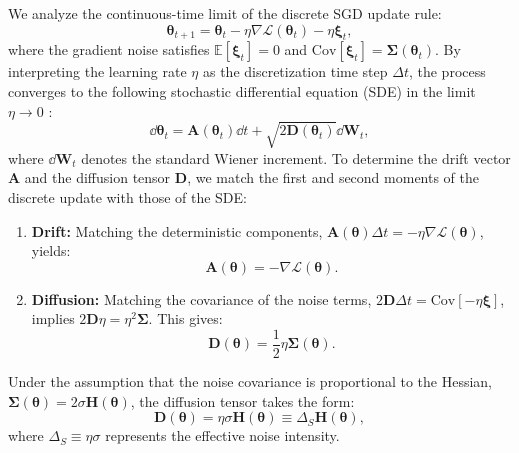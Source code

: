 \documentclass[aps,prx,reprint,superscriptaddress,longbibliography,nofootinbib,floatfix]{revtex4-2}
\begin{document}
We analyze the continuous-time limit of the discrete SGD update rule:
\begin{equation}
    \bm{\theta}_{t+1} = \bm{\theta}_t - \eta \nabla \mathcal{L}(\bm{\theta}_t) - \eta \bm{\xi}_t,
    \label{eq:si_sgd_update} 
\end{equation}
where the gradient noise satisfies $\mathbb{E}[\bm{\xi}_t] = 0$ and $\text{Cov}[\bm{\xi}_t] = \mathbf{\Sigma}(\bm{\theta}_t)$. By interpreting the learning rate $\eta$ as the discretization time step $\Delta t$, the process converges to the following stochastic differential equation (SDE) in the limit $\eta \to 0$ \cite{liHessianBasedAnalysis2020,liStochasticModifiedEquations2017}:
\begin{equation}
    \dd\bm{\theta}_t = \mathbf{A}(\bm{\theta}_t) \dd t + \sqrt{2\mathbf{D}(\bm{\theta}_t)} \dd \mathbf{W}_t,
    \label{eq:si_sde} 
\end{equation}
where $\dd \mathbf{W}_t$ denotes the standard Wiener increment. To determine the drift vector $\mathbf{A}$ and the diffusion tensor $\mathbf{D}$, we match the first and second moments of the discrete update with those of the SDE:

\begin{enumerate}
    \item \textbf{Drift:} Matching the deterministic components, $\mathbf{A}(\bm{\theta}) \Delta t = -\eta \nabla \mathcal{L}(\bm{\theta})$, yields:
    \begin{equation}
        \mathbf{A}(\bm{\theta}) = -\nabla \mathcal{L}(\bm{\theta}).
    \end{equation}
    \item \textbf{Diffusion:} Matching the covariance of the noise terms, $2\mathbf{D}\Delta t = \text{Cov}[-\eta \bm{\xi}]$, implies $2\mathbf{D}\eta = \eta^2 \mathbf{\Sigma}$. This gives:
    \begin{equation}
        \mathbf{D}(\bm{\theta}) = \frac{1}{2} \eta \mathbf{\Sigma}(\bm{\theta}).
    \end{equation}
\end{enumerate}

Under the assumption that the noise covariance is proportional to the Hessian, $\mathbf{\Sigma}(\bm{\theta}) = 2\sigma \mathbf{H}(\bm{\theta})$, the diffusion tensor takes the form:
\begin{equation}
    \mathbf{D}(\bm{\theta}) = \eta \sigma \mathbf{H}(\bm{\theta}) \equiv \Delta_S \mathbf{H}(\bm{\theta}),
    \label{eq:si_D_final}
\end{equation}
where $\Delta_S \equiv \eta\sigma$ represents the effective noise intensity.
\end{document}
